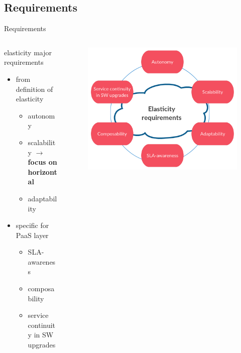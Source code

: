 \subsection{Requirements}
\begin{frame}{Requirements}
	\only<1>
	{
		\begin{columns}
			\begin{column}{0.6\textwidth}
				elasticity major requirements
				\begin{itemize}
					\item{\footnotesize{from definition of elasticity}}
					\begin{itemize}
						\item{\scriptsize{autonomy}}
						\item{\scriptsize{scalability $\rightarrow{}$ \textbf{focus on horizontal}}}
						\item{\scriptsize{adaptability}}
					\end{itemize}
					\item{\footnotesize{specific for PaaS layer}}
					\begin{itemize}
						\item{\scriptsize{SLA-awareness}}
						\item{\scriptsize{composability}}
						\item{\scriptsize{service continuity in SW upgrades}}
					\end{itemize}
				\end{itemize}
			\end{column}
			\begin{column}{0.4\textwidth}
				\begin{figure}
					\centering{}
					\includegraphics[scale=0.14]{images/elasticity-requirements.png}

\end{figure}
\end{column}
\end{columns}}
\end{frame}
